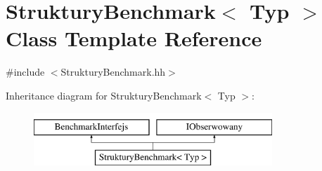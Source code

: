 \hypertarget{class_struktury_benchmark}{\section{Struktury\-Benchmark$<$ Typ $>$ Class Template Reference}
\label{class_struktury_benchmark}
}


{\ttfamily \#include $<$Struktury\-Benchmark.\-hh$>$}

Inheritance diagram for Struktury\-Benchmark$<$ Typ $>$\-:\begin{figure}[H]
\begin{center}
\leavevmode
\includegraphics[height=2.000000cm]{class_struktury_benchmark}
\end{center}
\end{figure}
